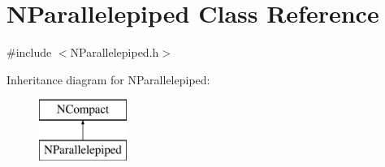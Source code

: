 \hypertarget{class_n_parallelepiped}{}\section{N\+Parallelepiped Class Reference}
\label{class_n_parallelepiped}


{\ttfamily \#include $<$N\+Parallelepiped.\+h$>$}

Inheritance diagram for N\+Parallelepiped\+:\begin{figure}[H]
\begin{center}
\leavevmode
\includegraphics[height=2.000000cm]{class_n_parallelepiped}
\end{center}
\end{figure}
